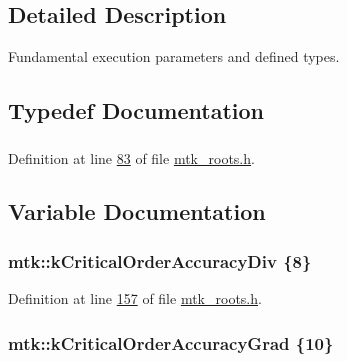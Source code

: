 \subsection{Detailed Description}
Fundamental execution parameters and defined types. 

\subsection{Typedef Documentation}
\hypertarget{group__c01-roots_gac080bbbf5cbb5502c9f00405f894857d}{
\subsubsection[{Real}]{}}\label{group__c01-roots_gac080bbbf5cbb5502c9f00405f894857d}


Definition at line \hyperlink{mtk__roots_8h_source_l00083}{83} of file \hyperlink{mtk__roots_8h_source}{mtk\-\_\-roots.\-h}.



\subsection{Variable Documentation}
\hypertarget{group__c01-roots_ga0898eef2108473e44a5223932d571c31}{
\subsubsection[{k\-Critical\-Order\-Accuracy\-Div}]{\setlength{\rightskip}{0pt plus 5cm}mtk\-::k\-Critical\-Order\-Accuracy\-Div \{8\}}}\label{group__c01-roots_ga0898eef2108473e44a5223932d571c31}


Definition at line \hyperlink{mtk__roots_8h_source_l00157}{157} of file \hyperlink{mtk__roots_8h_source}{mtk\-\_\-roots.\-h}.

\hypertarget{group__c01-roots_ga295dd2f403c775ecd942c22b5a777496}{
\subsubsection[{k\-Critical\-Order\-Accuracy\-Grad}]{\setlength{\rightskip}{0pt plus 5cm}mtk\-::k\-Critical\-Order\-Accuracy\-Grad \{10\}}}\label{group__c01-roots_ga295dd2f403c775ecd942c22b5a777496}


